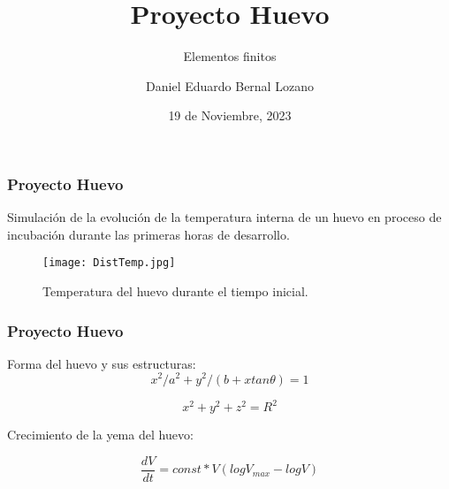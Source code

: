 \documentclass[11pt]{beamer}
\begin{document}
	\author{Daniel Eduardo Bernal Lozano}
	\title{Proyecto Huevo}
	\subtitle{Elementos finitos}
	\date{19 de Noviembre, 2023}
	\begin{frame}[plain]
		\maketitle
	\end{frame}
	
	
	\begin{frame}
		\frametitle{Proyecto Huevo}
		
		Simulación de la evolución de la temperatura interna de un huevo en proceso de incubación durante las primeras horas de desarrollo.
		
			\begin{figure}
			\centering
			\texttt{[image: DistTemp.jpg]}
			\caption{Temperatura del huevo durante el tiempo inicial.}
		\end{figure}
		
		
		
	\end{frame}

	\begin{frame}
	\frametitle{Proyecto Huevo}
	
	Forma del huevo y sus estructuras:
		\begin{equation}
		x^2/a^2+y^2/(b+xtan\theta)=1 
	\end{equation}

	\begin{equation}
	x^2 + y^2 + z^2 = R^2
\end{equation}

	Crecimiento de la yema del huevo:
	
	\begin{equation}
		\frac{dV}{dt}= const * V (log V_{max}-log V)
	\end{equation}
	
\end{frame}
\end{document}
